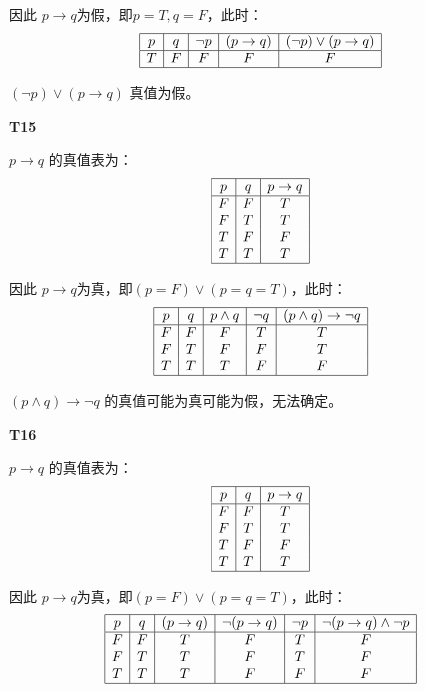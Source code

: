 \documentclass[12pt, a4paper]{ctexart}
\begin{document}
因此 $p \rightarrow q$为假，即$p = T, q = F$，此时：
\[
\begin{array}{|c|c|c|c|c|}
    \hline
    p & q & \lnot p & (p \rightarrow q) & (\lnot p) \lor (p \rightarrow q)\\
    \hline
    T & F & F & F & F\\
    \hline
\end{array}
\]

$(\lnot p) \lor (p \rightarrow q)$ 真值为假。

\textbf{T15}

$p \rightarrow q$ 的真值表为：\[
\begin{array}{|c|c|c|}
    \hline
    p & q & p \rightarrow q\\
    \hline
    F & F & T\\
    F & T & T\\
    T & F & F\\
    T & T & T\\
    \hline    
\end{array}
\]

因此 $p \rightarrow q$为真，即$(p = F) \lor (p = q = T)$，此时：
\[
\begin{array}{|c|c|c|c|c|}
    \hline
    p & q & p \land q & \lnot q & (p \land q) \rightarrow \lnot q\\
    \hline
    F & F & F & T & T\\
    F & T & F & F & T\\
    T & T & T & F & F\\
    \hline
\end{array}
\]

$(p \land q) \rightarrow \lnot q$ 的真值可能为真可能为假，无法确定。

\textbf{T16}

$p \rightarrow q$ 的真值表为：\[
\begin{array}{|c|c|c|}
    \hline
    p & q & p \rightarrow q\\
    \hline
    F & F & T\\
    F & T & T\\
    T & F & F\\
    T & T & T\\
    \hline    
\end{array}
\]

因此 $p \rightarrow q$为真，即$(p = F) \lor (p = q = T)$，此时：
\[
\begin{array}{|c|c|c|c|c|c|}
    \hline
    p & q & (p \rightarrow q) & \lnot (p \rightarrow q) & \lnot p & \lnot (p \rightarrow q) \land \lnot p\\
    \hline
    F & F & T & F & T & F\\
    F & T & T & F & T & F\\
    T & T & T & F & F & F\\
    \hline
\end{array}
\]
\end{document}
